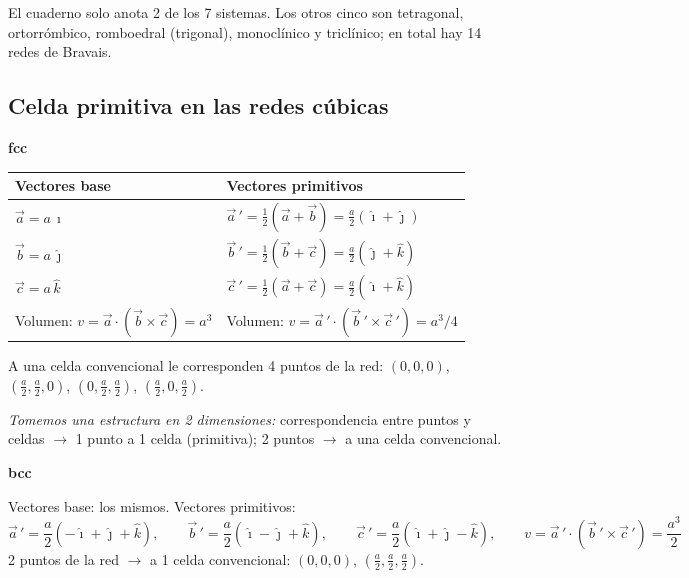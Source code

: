\documentclass[11pt,a4paper]{article}
\newcommand{\ii}{\hat{\imath}}
\newcommand{\jj}{\hat{\jmath}}
\newcommand{\kk}{\hat{k}}
\begin{document}
\begin{obs}
El cuaderno solo anota 2 de los 7 sistemas. Los otros cinco son tetragonal, ortorrómbico, romboedral (trigonal),
monoclínico y triclínico; en total hay 14 redes de Bravais.
\end{obs}

\subsection{Celda primitiva en las redes cúbicas}
\textbf{fcc}
\begin{center}
\renewcommand{\arraystretch}{1.3}
\begin{tabular}{ll}
\toprule
Vectores base & Vectores primitivos\\
\midrule
$\vec a=a\,\ii$ & $\vec a\,'=\frac12(\vec a+\vec b)=\frac a2(\ii+\jj)$\\
$\vec b=a\,\jj$ & $\vec b\,'=\frac12(\vec b+\vec c)=\frac a2(\jj+\kk)$\\
$\vec c=a\,\kk$ & $\vec c\,'=\frac12(\vec a+\vec c)=\frac a2(\ii+\kk)$\\
Volumen: $v=\vec a\cdot(\vec b\times\vec c)=a^3$ & Volumen: $v=\vec a\,'\cdot(\vec b\,'\times\vec c\,')=a^3/4$\\
\bottomrule
\end{tabular}
\end{center}
A una celda convencional le corresponden 4 puntos de la red: $(0,0,0)$, $(\tfrac a2,\tfrac a2,0)$, $(0,\tfrac a2,\tfrac a2)$, $(\tfrac a2,0,\tfrac a2)$.

\emph{Tomemos una estructura en 2 dimensiones:} correspondencia entre puntos y celdas $\rightarrow$ 1 punto a 1 celda (primitiva);
2 puntos $\rightarrow$ a una celda convencional.

\textbf{bcc}

Vectores base: los mismos. Vectores primitivos:
\[
\vec a\,'=\frac a2(-\ii+\jj+\kk),\qquad \vec b\,'=\frac a2(\ii-\jj+\kk),\qquad \vec c\,'=\frac a2(\ii+\jj-\kk),\qquad
v=\vec a\,'\cdot(\vec b\,'\times\vec c\,')=\frac{a^3}{2}
\]
2 puntos de la red $\rightarrow$ a 1 celda convencional: $(0,0,0)$, $(\tfrac a2,\tfrac a2,\tfrac a2)$.
\end{document}
